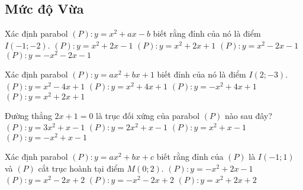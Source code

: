 \subsection*{Mức độ Vừa}
\begin{ex}%
	Xác định parabol $(P): y=x^2+ax-b$ biết rằng đỉnh của nó là điểm $I(-1;-2)$.
	\choice
	{\True $(P): y = x^2+2x - 1 $}
	{$(P):  y = x^2+2x +1 $}
	{$(P):  y = x^2-2x - 1 $}
	{$(P):  y = - x^2- 2x - 1 $}
\end{ex}
\begin{ex}%
	Xác định parabol $(P): y=ax^2+bx+1$ biết đỉnh của nó là điểm $I(2;-3).$
	\choice
	{\True $(P):  y = x^2-4x + 1 $}
	{$(P):  y = x^2+4x +1 $}
	{$(P):  y = -x^2+4x +1 $}
	{$(P):  y = x^2+2x +1 $}
\end{ex}

\begin{ex}%
	Đường thẳng $2x+1=0$ là trục đối xứng của parabol $(P)$ nào sau đây?
	\choice
	{$(P): y = 3x^2+x-1$}
	{$(P): y = 2x^2+x-1$}
	{\True $(P): y = x^2+x-1$}
	{$(P): y = -x^2+x-1$}
\end{ex}

\begin{ex}%
	Xác định parabol $(P): y=ax^2+bx+c$ biết rằng đỉnh của $(P)$ là $I(-1;1)$ và $(P)$ cắt trục hoành tại điểm $M(0;2).$
	\choice
	{$(P):  y = -x^2+2x - 1 $}
	{$(P):  y = x^2-2x +2 $}
	{$(P):  y = -x^2-2x +2 $}
	{\True $(P):  y =  x^2+ 2x +2 $}
\end{ex}


